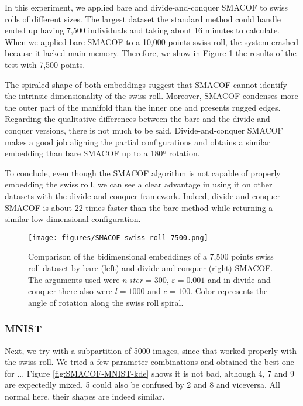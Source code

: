 In this experiment, we applied bare and divide-and-conquer SMACOF to swiss rolls of different sizes. The largest dataset the standard method could handle ended up having 7,500 individuals and taking about 16 minutes to calculate. When we applied bare SMACOF to a 10,000 points swiss roll, the system crashed because it lacked main memory. Therefore, we show in Figure \ref{fig:SMACOF-swiss-roll-7500} the results of the test with 7,500 points.

The spiraled shape of both embeddings suggest that SMACOF cannot identify the intrinsic dimensionality of the swiss roll. Moreover, SMACOF condenses more the outer part of the manifold than the inner one and presents rugged edges. Regarding the qualitative differences between the bare and the divide-and-conquer versions, there is not much to be said. Divide-and-conquer SMACOF makes a good job aligning the partial configurations and obtains a similar embedding than bare SMACOF up to a 180º rotation.

To conclude, even though the SMACOF algorithm is not capable of properly embedding the swiss roll, we can see a clear advantage in using it on other datasets with the divide-and-conquer framework. Indeed, divide-and-conquer SMACOF is about 22 times faster than the bare method while returning a similar low-dimensional configuration.

\begin{figure}[ht]
    \centering
    \texttt{[image: figures/SMACOF-swiss-roll-7500.png]}
    \caption{Comparison of the bidimensional embeddings of a 7,500 points swiss roll dataset \citep{Spiwokv2007} by bare (left) and divide-and-conquer (right) SMACOF. The arguments used were $n\_iter = 300,\, \varepsilon = 0.001$ and in divide-and-conquer there also were $l=1000$ and $c=100$. Color represents the angle of rotation along the swiss roll spiral.}
    \label{fig:SMACOF-swiss-roll-7500}
\end{figure}


\subsubsection{MNIST}

Next, we try with a subpartition of 5000 images, since that worked properly with the swiss roll. We tried a few parameter combinations and obtained the best one for ... Figure \ref{fig:SMACOF-MNIST-kde} shows it is not bad, although 4, 7 and 9 are expectedly mixed. 5 could also be confused by 2 and 8 and viceversa. All normal here, their shapes are indeed similar.

